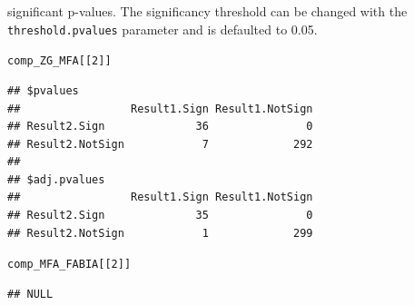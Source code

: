 \documentclass[a4paper]{article}\usepackage[]{graphicx}\usepackage[]{color}
\makeatletter
\newcommand{\hlnum}[1]{\textcolor[rgb]{0.686,0.059,0.569}{#1}}%
\newcommand{\hlstd}[1]{\textcolor[rgb]{0.345,0.345,0.345}{#1}}%
\newenvironment{kframe}{%
 \def\at@end@of@kframe{}%
 \ifinner\ifhmode%
  \def\at@end@of@kframe{\end{minipage}}%
  \begin{minipage}{\columnwidth}%
 \fi\fi%
 \def\FrameCommand##1{\hskip\@totalleftmargin \hskip-\fboxsep
 \colorbox{shadecolor}{##1}\hskip-\fboxsep
     \hskip-\linewidth \hskip-\@totalleftmargin \hskip\columnwidth}%
 \MakeFramed {\advance\hsize-\width
   \@totalleftmargin\z@ \linewidth\hsize
   \@setminipage}}%
 {\par\unskip\endMakeFramed%
 \at@end@of@kframe}
\newenvironment{knitrout}{}{} %
\makeatother
\begin{document}
significant p-values. The significancy threshold can be changed with the
\texttt{threshold.pvalues} parameter and is defaulted to 0.05.
\begin{knitrout}
\color{fgcolor}\begin{kframe}
\begin{alltt}
\hlstd{comp_ZG_MFA[[}\hlnum{2}\hlstd{]]}
\end{alltt}
\begin{verbatim}
## $pvalues
##                 Result1.Sign Result1.NotSign
## Result2.Sign              36               0
## Result2.NotSign            7             292
## 
## $adj.pvalues
##                 Result1.Sign Result1.NotSign
## Result2.Sign              35               0
## Result2.NotSign            1             299
\end{verbatim}
\begin{alltt}
\hlstd{comp_MFA_FABIA[[}\hlnum{2}\hlstd{]]}
\end{alltt}
\begin{verbatim}
## NULL
\end{verbatim}
\end{kframe}
\end{knitrout}

\newpage
\nocite{*}


\end{document}
